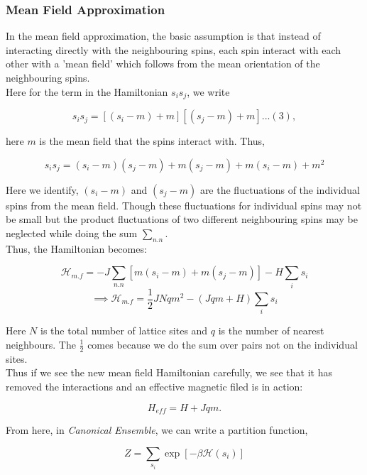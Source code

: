 \documentclass[24pt]{article}
\begin{document}
\subsubsection{{\large \textbf{Mean Field Approximation}}}
{\large In the mean field approximation, the basic assumption is that instead of interacting directly with the neighbouring spins, each spin interact with each other with a 'mean field' which follows from the mean orientation of the neighbouring spins.\\
Here for the term in the Hamiltonian $s_i s_j$, we write

\begin{equation}
s_i s_j = [(s_i - m)+m][(s_j - m)+ m] ...(3),
\end{equation}

here $m$ is the mean field that the spins interact with. Thus,

\begin{equation}
s_i s_j  = (s_i - m)(s_j - m) + m(s_j - m) + m(s_i - m)+ m^2
\end{equation}
 


Here we identify, $(s_i - m)$ and $(s_j - m)$ are the fluctuations of the individual spins from the mean field. Though these fluctuations for individual spins may not be small but the product fluctuations of two different neighbouring spins  may be neglected while doing the sum $\sum_{n.n}$.\\
Thus, the Hamiltonian becomes:

$$\mathcal{H}_{m.f} = -J \sum_{n.n} [m (s_i - m) + m (s_j - m)] - H \sum_{i} s_i
$$
\begin{equation}
\implies \mathcal{H}_{m.f} = \frac{1}{2} J N q m^2 - (J q m + H)\sum_{i} s_i
\end{equation}

Here $N$ is the total number of lattice sites and $q$ is the number of nearest neighbours. The $\frac{1}{2}$ comes because we do the sum over pairs not on the individual sites.\\
Thus if we see the new mean field Hamiltonian carefully, we see that it has removed the interactions and an effective magnetic filed is in action:

\begin{equation}
H_{eff} = H + J q m. 
\end{equation}

From here, in \textit{Canonical Ensemble}, we can write a partition function,

\begin{equation}
Z= \sum_{s_i} \exp[-\beta \mathcal{H}(s_i)]
 \end{equation}

}
\end{document}
